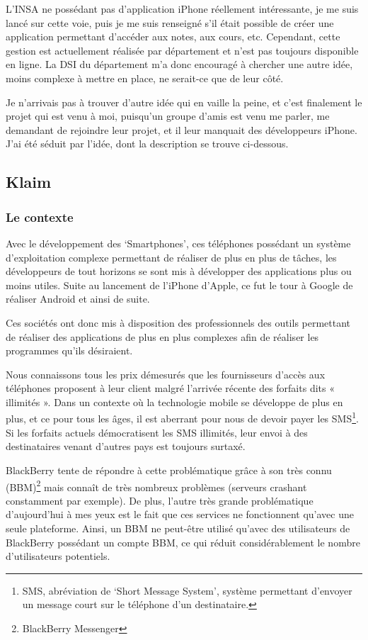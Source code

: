 \documentclass{article}
\begin{document}
	L'INSA ne possédant pas d'application iPhone réellement intéressante, je me suis lancé sur cette voie, puis je me suis renseigné s'il était possible de créer une application permettant d'accéder aux notes, aux cours, etc. Cependant, cette gestion est actuellement réalisée par département et n'est pas toujours disponible en ligne. La DSI du département m'a donc encouragé à chercher une autre idée, moins complexe à mettre en place, ne serait-ce que de leur côté.
	
	Je n'arrivais pas à trouver d'autre idée qui en vaille la peine, et c'est finalement le projet qui est venu à moi, puisqu’un groupe d’amis est venu me parler, me demandant de rejoindre leur projet, et il leur manquait des développeurs iPhone. J’ai été séduit par l’idée, dont la description se trouve ci-dessous.
\subsection{Klaim}
\subsubsection{Le contexte}
	Avec le développement des ‘Smartphones’, ces téléphones possédant un système d’exploitation complexe permettant de réaliser de plus en plus de tâches, les développeurs de tout horizons se sont mis à développer des applications plus ou moins utiles. Suite au lancement de l’iPhone d’Apple, ce fut le tour à Google de réaliser Android et ainsi de suite.
	
	Ces sociétés ont donc mis à disposition des professionnels des outils permettant de réaliser des applications de plus en plus complexes afin de réaliser les programmes qu'ils désiraient. 
	
	Nous connaissons tous les prix démesurés que les fournisseurs d’accès aux téléphones proposent à leur client malgré l’arrivée récente des forfaits dits « illimités ». Dans un contexte où la technologie mobile se développe de plus en plus, et ce pour tous les âges, il est aberrant  pour nous de devoir payer les SMS\footnote{SMS, abréviation de ‘Short Message System’, système permettant d’envoyer un message court sur le téléphone d’un destinataire.}. Si les forfaits actuels démocratisent les SMS illimités, leur envoi à des destinataires venant d’autres pays est toujours surtaxé. 
	
	BlackBerry tente de répondre à cette problématique grâce à son très connu (BBM)\footnote{BlackBerry Messenger} mais connaît de très nombreux problèmes (serveurs crashant constamment par exemple). De plus, l’autre très grande problématique d’aujourd’hui à mes yeux est le fait que ces services ne fonctionnent qu’avec une seule plateforme. Ainsi, un BBM ne peut-être utilisé qu’avec des utilisateurs de BlackBerry possédant un compte BBM, ce qui réduit considérablement le nombre d'utilisateurs potentiels. 
	
\end{document}
